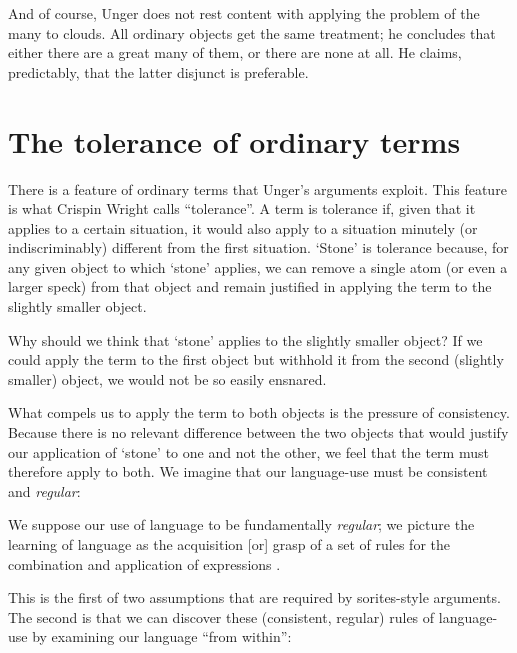 \documentclass[11pt]{article}
\newenvironment{squote}{%
\begin{spacing}{1}
       	\begin{list}{}{%
\setlength{\labelwidth}{0pt}%
\rightmargin\leftmargin%
}
\item\relax
}{%
\end{list}%
\end{spacing}
}
\begin{document}
\begin{spacing}{1.5}
And of course, Unger does not rest content with applying the problem
of the many to clouds.  All ordinary objects get the same treatment;
he concludes that either there are a great many of them, or there are
none at all.  He claims, predictably, that the latter disjunct is
preferable.

\section{The tolerance of ordinary terms}
There is a feature of ordinary terms that Unger's arguments exploit.
This feature is what Crispin Wright calls ``tolerance''.  A term is
tolerance if, given that it applies to a certain situation, it would
also apply to a situation minutely (or indiscriminably) different from
the first situation.  `Stone' is tolerance because, for any given
object to which `stone' applies, we can remove a single atom (or even
a larger speck) from that object and remain justified in applying the
term to the slightly smaller object.

Why should we think that `stone' applies to the slightly smaller
object?  If we could apply the term to the first object but withhold
it from the second (slightly smaller) object, we would not be so
easily ensnared.

What compels us to apply the term to both objects is the pressure of
consistency.  Because there is no relevant difference between the two
objects that would justify our application of `stone' to one and not
the other, we feel that the term must therefore apply to both.  We
imagine that our language-use must be consistent and {\em regular}:

\begin{squote}
We suppose our use of language to be fundamentally {\em regular}; we
picture the learning of language as the acquisition [or] grasp of a
set of rules for the combination and application of expressions
\citep[326]{wright1975}.

This is the first of two assumptions that are required by
sorites-style arguments.  The second is that we can discover these
(consistent, regular) rules of language-use by examining our language
``from within'':


\end{squote}
\end{spacing}
\end{document}
